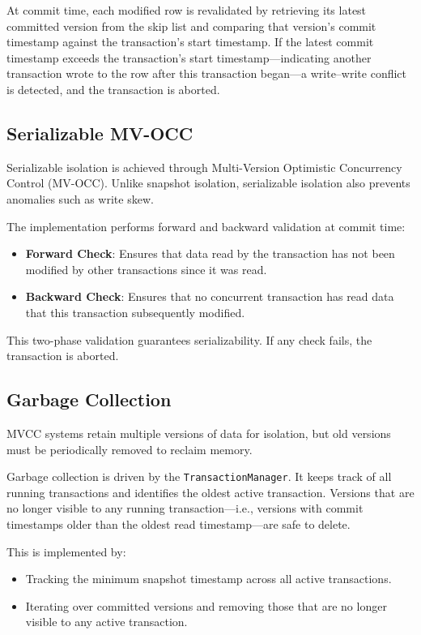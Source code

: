 \documentclass{article}
\begin{document}
At commit time, each modified row is revalidated by retrieving its latest committed version from the skip list and comparing that version’s commit timestamp against the transaction’s start timestamp. If the latest commit timestamp exceeds the transaction’s start timestamp—indicating another transaction wrote to the row after this transaction began—a write–write conflict is detected, and the transaction is aborted.
\subsection{Serializable MV-OCC}
Serializable isolation is achieved through Multi-Version Optimistic Concurrency Control (MV-OCC). Unlike snapshot isolation, serializable isolation also prevents anomalies such as write skew.

The implementation performs forward and backward validation at commit time:
\begin{itemize}
    \item \textbf{Forward Check}: Ensures that data read by the transaction has not been modified by other transactions since it was read.
    \item \textbf{Backward Check}: Ensures that no concurrent transaction has read data that this transaction subsequently modified.
\end{itemize}

This two-phase validation guarantees serializability. If any check fails, the transaction is aborted.
\subsection{Garbage Collection}
MVCC systems retain multiple versions of data for isolation, but old versions must be periodically removed to reclaim memory.

Garbage collection is driven by the \texttt{TransactionManager}. It keeps track of all running transactions and identifies the oldest active transaction. Versions that are no longer visible to any running transaction—i.e., versions with commit timestamps older than the oldest read timestamp—are safe to delete.

This is implemented by:
\begin{itemize}
    \item Tracking the minimum snapshot timestamp across all active transactions.
    \item Iterating over committed versions and removing those that are no longer visible to any active transaction.
\end{itemize}
\end{document}
